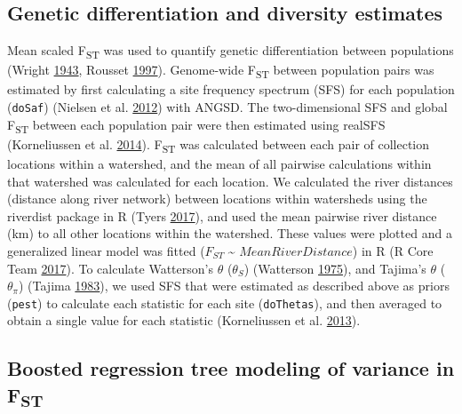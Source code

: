 \documentclass[twoside,12pt,final]{ucthesis-CA2012} %
\begin{document}
\begin{ucmainmatter}
\hypertarget{genetic-differentiation-and-diversity-estimates}{%
\subsection{Genetic differentiation and diversity
estimates}\label{genetic-differentiation-and-diversity-estimates}}

Mean scaled F\textsubscript{ST} was used to quantify genetic
differentiation between populations (Wright
\protect\hyperlink{ref-wright_isolation_1943}{1943}, Rousset
\protect\hyperlink{ref-rousset_genetic_1997}{1997}). Genome-wide
F\textsubscript{ST} between population pairs was estimated by first
calculating a site frequency spectrum (SFS) for each population
(\texttt{doSaf}) (Nielsen et al.
\protect\hyperlink{ref-nielsen_snp_2012}{2012}) with ANGSD. The
two-dimensional SFS and global F\textsubscript{ST} between each
population pair were then estimated using realSFS (Korneliussen et al.
\protect\hyperlink{ref-korneliussen_angsd_2014}{2014}).
F\textsubscript{ST} was calculated between each pair of collection
locations within a watershed, and the mean of all pairwise calculations
within that watershed was calculated for each location. We calculated
the river distances (distance along river network) between locations
within watersheds using the riverdist package in R (Tyers
\protect\hyperlink{ref-tyers_riverdist_2017}{2017}), and used the mean
pairwise river distance (km) to all other locations within the
watershed. These values were plotted and a generalized linear model was
fitted (\(F_{ST}\) \textasciitilde{} \(Mean River Distance\)) in R (R
Core Team \protect\hyperlink{ref-r_core_team_r_2017}{2017}). To
calculate Watterson's \(\theta\) (\(\theta_S\)) (Watterson
\protect\hyperlink{ref-watterson_number_1975}{1975}), and Tajima's
\(\theta\) (\(\theta_\pi\)) (Tajima
\protect\hyperlink{ref-tajima_evolutionary_1983}{1983}), we used SFS
that were estimated as described above as priors (\texttt{pest}) to
calculate each statistic for each site (\texttt{doThetas}), and then
averaged to obtain a single value for each statistic (Korneliussen et
al. \protect\hyperlink{ref-korneliussen_calculation_2013}{2013}).

\hypertarget{boosted-regression-tree-modeling-of-variance-in-fst}{%
\subsection{\texorpdfstring{Boosted regression tree modeling of variance
in
F\textsubscript{ST}}{Boosted regression tree modeling of variance in FST}}\label{boosted-regression-tree-modeling-of-variance-in-fst}}


\end{ucmainmatter}
\end{document}
